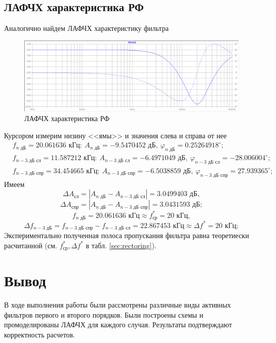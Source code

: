 \documentclass[a4paper, 12pt]{article}
\begin{document}
    \subsection{ЛАФЧХ характеристика РФ}
    Аналогично найдем ЛАФЧХ характеристику фильтра
    \begin{figure}[H]
        \centering
        \includegraphics[scale=0.46]{5task_lapfr.png}
        \captionsetup{skip=0pt}
        \caption{ЛАФЧХ характеристика РФ}
        \label{fig:5task_lapfr}
    \end{figure}
    \noindent Курсором измерим низину <<ямы>> и значения слева и справа от нее
    \begin{align*}
        &f_{n\text{ дБ}}=20.061636\text{ кГц}:\ A_{n\text{ дБ}}=-9.5470452\text{ дБ},\ \varphi_{n\text{ дБ}}=0.25264918^{\circ};\\
        &f_{n-3\text{ дБ сл}}=11.587212 \text{ кГц}:\ A_{n-3\text{ дБ сл}}=-6.4971049\text{ дБ},\ \varphi_{n-3\text{ дБ сл}}=-28.006004^{\circ};\\
        &f_{n-3\text{ дБ спр}}=34.454665 \text{ кГц}:\ A_{n-3\text{ дБ спр}}=-6.5038859\text{ дБ},\ \varphi_{n-3\text{ дБ спр}}=27.939365^{\circ};
    \end{align*}
    Имеем
    $$
    \Delta A_\text{сл}=|A_{n\text{ дБ}}-A_{n-3\text{ дБ сл}}|=3.0499403\text{ дБ},
    $$
    $$
    \Delta A_\text{спр}=|A_{n\text{ дБ}}-A_{n-3\text{ дБ спр}}|=3.0431593\text{ дБ};
    $$
    $$
    f_{n\text{ дБ}}=20.061636\text{ кГц}\approx f_\text{ср}^*=20\text{ кГц},
    $$
    $$
    \Delta f_{n-3\text{ дБ}}=f_{n-3\text{ дБ спр}}-f_{n-3\text{ дБ сл}}=22.867453\text{ кГц}\approx \Delta f^*=20\text{ кГц};
    $$
    Экспериментально полученная полоса пропускания фильтра равна теоретиески расчитанной (см. $f_\text{ср}^*,\Delta f^*$ в табл. \ref{sec:rectoring}).


    \section{Вывод}
    В ходе выполнения работы были рассмотрены различные виды
    активных фильтров первого и второго порядков. Были построены
    схемы и промоделированы ЛАФЧХ для каждого случая. Результаты
    подтверждают корректность расчетов.
\end{document}
